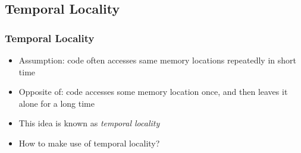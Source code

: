 \subsection{Temporal Locality}

\frame{\tableofcontents[currentsubsection]}

\begin{frame}
  \frametitle{Temporal Locality}
  \begin{itemize}
    \item Assumption: code often accesses same memory locations repeatedly in short time
    \item Opposite of: code accesses some memory location once, and then leaves it alone for a long time
    \item This idea is known as \emph{temporal locality}
    \item How to make use of temporal locality?
  \end{itemize}
\end{frame}

